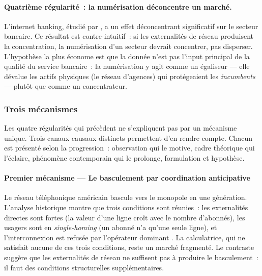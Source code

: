 \paragraph{Quatrième régularité~: la numérisation déconcentre un marché.}

L'internet banking, étudié par \textcite{lyons_digital_2024}, a un effet déconcentrant significatif sur le secteur bancaire. Ce résultat est contre-intuitif~: si les externalités de réseau produisent la concentration, la numérisation d'un secteur devrait concentrer, pas disperser. L'hypothèse la plus économe est que la donnée n'est pas l'input principal de la qualité du service bancaire~: la numérisation y agit comme un égaliseur --- elle dévalue les actifs physiques (le réseau d'agences) qui protégeaient les \emph{incumbents} --- plutôt que comme un concentrateur.


\subsubsection{Trois mécanismes}

Les quatre régularités qui précèdent ne s'expliquent pas par un mécanisme unique. Trois canaux causaux distincts permettent d'en rendre compte. Chacun est présenté selon la progression~: observation qui le motive, cadre théorique qui l'éclaire, phénomène contemporain qui le prolonge, formulation et hypothèse.

\paragraph{Premier mécanisme --- Le basculement par coordination anticipative}

\markNEO \markEVO

Le réseau téléphonique américain bascule vers le monopole en une génération. L'analyse historique montre que trois conditions sont réunies~: les externalités directes sont fortes (la valeur d'une ligne croît avec le nombre d'abonnés), les usagers sont en \emph{single-homing} (un abonné n'a qu'une seule ligne), et l'interconnexion est refusée par l'opérateur dominant \parencite{beauchamp_invented_2010}. La calculatrice, qui ne satisfait aucune de ces trois conditions, reste un marché fragmenté. Le contraste suggère que les externalités de réseau ne suffisent pas à produire le basculement~: il faut des conditions structurelles supplémentaires.

